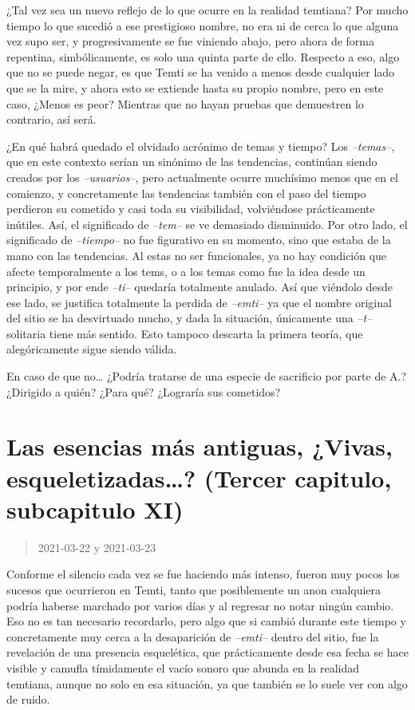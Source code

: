 \documentclass[
  spanish,
]{book}
\begin{document}
¿Tal vez sea un nuevo reflejo de lo que ocurre en la realidad temtiana? Por mucho tiempo lo que sucedió a ese prestigioso nombre, no era ni de cerca lo que alguna vez supo ser, y progresivamente se fue viniendo abajo, pero ahora de forma repentina, simbólicamente, es solo una quinta parte de ello.
Respecto a eso, algo que no se puede negar, es que Temti se ha venido a menos desde cualquier lado que se la mire, y ahora esto se extiende hasta su propio nombre, pero en este caso, ¿Menos es peor?
Mientras que no hayan pruebas que demuestren lo contrario, así será.

¿En qué habrá quedado el olvidado acrónimo de temas y tiempo?
Los \emph{--temas--}, que en este contexto serían un sinónimo de las tendencias, continúan siendo creados por los \emph{--usuarios--}, pero actualmente ocurre muchísimo menos que en el comienzo, y concretamente las tendencias también con el paso del tiempo perdieron su cometido y casi toda su visibilidad, volviéndose prácticamente inútiles. Así, el significado de \emph{--tem--} se ve demasiado disminuido.
Por otro lado, el significado de \emph{--tiempo--} no fue figurativo en su momento, sino que estaba de la mano con las tendencias. Al estas no ser funcionales, ya no hay condición que afecte temporalmente a los tems, o a los temas como fue la idea desde un principio, y por ende \emph{--ti--} quedaría totalmente anulado.
Así que viéndolo desde ese lado, se justifica totalmente la perdida de \emph{--emti--} ya que el nombre original del sitio se ha desvirtuado mucho, y dada la situación, únicamente una \emph{--t--} solitaria tiene más sentido. Esto tampoco descarta la primera teoría, que alegóricamente sigue siendo válida.

En caso de que no\ldots{} ¿Podría tratarse de una especie de sacrificio por parte de A.? ¿Dirigido a quién? ¿Para qué? ¿Lograría sus cometidos?

\hypertarget{las-esencias-muxe1s-antiguas-vivas-esqueletizadas-tercer-capitulo-subcapitulo-xi}{%
\section{Las esencias más antiguas, ¿Vivas, esqueletizadas\ldots? (Tercer capitulo, subcapitulo XI)}\label{las-esencias-muxe1s-antiguas-vivas-esqueletizadas-tercer-capitulo-subcapitulo-xi}}

\begin{quote}
2021-03-22 y 2021-03-23
\end{quote}

Conforme el silencio cada vez se fue haciendo más intenso, fueron muy pocos los sucesos que ocurrieron en Temti, tanto que posiblemente un anon cualquiera podría haberse marchado por varios días y al regresar no notar ningún cambio. Eso no es tan necesario recordarlo, pero algo que si cambió durante este tiempo y concretamente muy cerca a la desaparición de \emph{--emti--} dentro del sitio, fue la revelación de una presencia esquelética, que prácticamente desde esa fecha se hace visible y camufla tímidamente el vacío sonoro que abunda en la realidad temtiana, aunque no solo en esa situación, ya que también se lo suele ver con algo de ruido.
\end{document}
